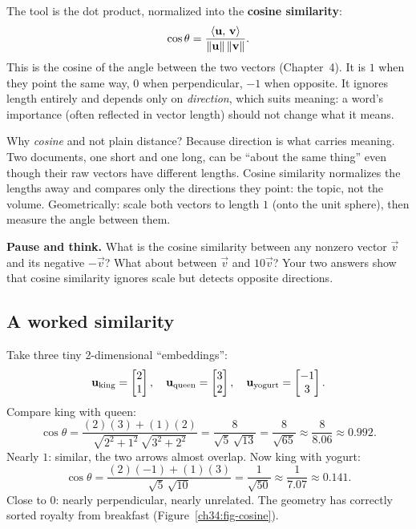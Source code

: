 The tool is the dot product, normalized into the \textbf{cosine similarity}:
\[
\cos\theta = \frac{\langle \mathbf{u},\, \mathbf{v} \rangle}{\lVert\mathbf{u}\rVert\,\lVert\mathbf{v}\rVert}.
\]
This is the cosine of the angle between the two vectors (Chapter~4). It is $1$ when they
point the same way, $0$ when perpendicular, $-1$ when opposite. It ignores length entirely
and depends only on \emph{direction}, which suits meaning: a word's
importance (often reflected in vector length) should not change what it means.

\begin{intuitionbox}
Why \emph{cosine} and not plain distance? Because direction is what carries meaning.
Two documents, one short and one long, can be ``about the same thing'' even though their
raw vectors have different lengths. Cosine similarity normalizes the lengths away
and compares only the directions they point: the topic, not the volume. Geometrically:
scale both vectors to length $1$ (onto the unit sphere), then measure the angle between
them.
\end{intuitionbox}

\begin{recoverybox}
\textbf{Pause and think.} What is the cosine similarity between any nonzero vector
$\vec{v}$ and its negative $-\vec{v}$? What about between $\vec{v}$ and $10\vec{v}$?
Your two answers show that cosine similarity ignores scale but detects opposite
directions.
\end{recoverybox}

\subsection{A worked similarity}

Take three tiny 2-dimensional ``embeddings'':
\[
\mathbf{u}_{\text{king}}=\begin{bmatrix}2\\1\end{bmatrix},\quad
\mathbf{u}_{\text{queen}}=\begin{bmatrix}3\\2\end{bmatrix},\quad
\mathbf{u}_{\text{yogurt}}=\begin{bmatrix}-1\\3\end{bmatrix}.
\]
Compare king with queen:
\[
\cos\theta = \frac{(2)(3)+(1)(2)}{\sqrt{2^2+1^2}\,\sqrt{3^2+2^2}}
= \frac{8}{\sqrt{5}\,\sqrt{13}} = \frac{8}{\sqrt{65}} \approx \frac{8}{8.06} \approx 0.992.
\]
Nearly $1$: similar, the two arrows almost overlap. Now king with yogurt:
\[
\cos\theta = \frac{(2)(-1)+(1)(3)}{\sqrt{5}\,\sqrt{10}}
= \frac{1}{\sqrt{50}} \approx \frac{1}{7.07}\approx 0.141.
\]
Close to $0$: nearly perpendicular, nearly unrelated. The geometry has correctly sorted
royalty from breakfast (Figure~\ref{ch34:fig-cosine}).

